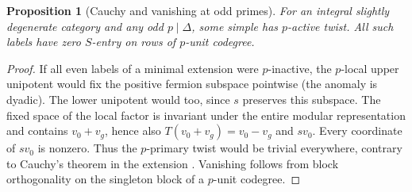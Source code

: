 \documentclass[11pt,a4paper]{article}
\numberwithin{equation}{section}
\newtheorem{proposition}[theorem]{Proposition}
\theoremstyle{remark}
\begin{document}
\begin{proposition}[Cauchy and vanishing at odd primes]\label{fam:M:3.4}\label{lem:reduced-cauchy}
For an integral slightly degenerate category and any odd $p\mid\Delta$,
some simple has $p$-active twist. All such labels have zero $S$-entry on
rows of $p$-unit codegree.
\end{proposition}
\begin{proof}
If all even labels of a minimal extension were $p$-inactive,
the $p$-local upper unipotent would fix the positive fermion subspace
pointwise (the anomaly is dyadic). The lower unipotent would too,
since $s$ preserves this subspace. The fixed space of the local
factor is invariant under the entire modular representation and
contains $v_0+v_g$, hence also $T(v_0+v_g)=v_0-v_g$ and $sv_0$.
Every coordinate of $sv_0$ is nonzero. Thus the $p$-primary twist
would be trivial everywhere, contrary to Cauchy's theorem in the
extension \cite[Theorem~3.9]{BNRWFinite}. Vanishing follows from
block orthogonality on the singleton block of a $p$-unit codegree.
\end{proof}
\end{document}
